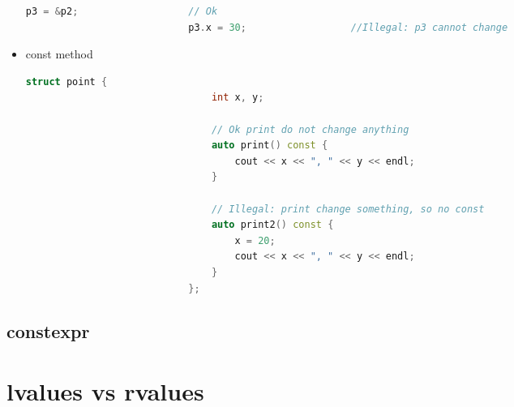 \documentclass[12pt, fleqn]{report}                             %
\theoremstyle{break}                                            %
\begin{document}
\begin{itemize}
\begin{lstlisting}[language=C++, gobble=28]
                            p3 = &p2;                   // Ok
                            p3.x = 30;                  //Illegal: p3 cannot change
                        \end{lstlisting}

                    \clearpage
                    \item const method
                        \begin{lstlisting}[language=C++, gobble=28]
                            struct point {
                                int x, y;

                                // Ok print do not change anything
                                auto print() const {                   
                                    cout << x << ", " << y << endl;
                                }

                                // Illegal: print change something, so no const
                                auto print2() const { 
                                    x = 20;                  
                                    cout << x << ", " << y << endl;
                                }
                            };
                        \end{lstlisting}

                \end{itemize}
               
               

            \subsection{constexpr}



        \clearpage
        \section{lvalues vs rvalues}
\end{document}
